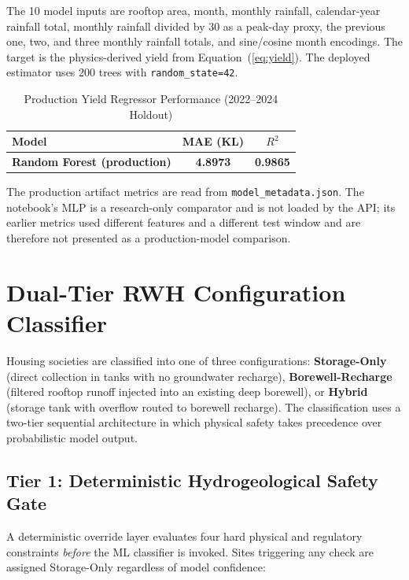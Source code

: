 ﻿\documentclass[conference]{IEEEtran}
\begin{document}
The 10 model inputs are rooftop area, month, monthly rainfall, calendar-year rainfall total, monthly rainfall divided by 30 as a peak-day proxy, the previous one, two, and three monthly rainfall totals, and sine/cosine month encodings. The target is the physics-derived yield from Equation~(\ref{eq:yield}). The deployed estimator uses 200 trees with \texttt{random\_state=42}.

\begin{table}[htbp]
\caption{Production Yield Regressor Performance (2022--2024 Holdout)}
\begin{center}
\begin{tabular}{lcc}
\toprule
\textbf{Model} & \textbf{MAE (KL)} & \textbf{$R^2$} \\
\midrule
\textbf{Random Forest (production)} & \textbf{4.8973} & \textbf{0.9865} \\
\bottomrule
\end{tabular}
\label{tab:yield-model}
\end{center}
\end{table}

The production artifact metrics are read from \texttt{model\_metadata.json}. The notebook's MLP is a research-only comparator and is not loaded by the API; its earlier metrics used different features and a different test window and are therefore not presented as a production-model comparison.

\section{Dual-Tier RWH Configuration Classifier}
\label{sec:classifier}

Housing societies are classified into one of three configurations: \textbf{Storage-Only} (direct collection in tanks with no groundwater recharge), \textbf{Borewell-Recharge} (filtered rooftop runoff injected into an existing deep borewell), or \textbf{Hybrid} (storage tank with overflow routed to borewell recharge). The classification uses a two-tier sequential architecture in which physical safety takes precedence over probabilistic model output.

\subsection{Tier 1: Deterministic Hydrogeological Safety Gate}

A deterministic override layer evaluates four hard physical and regulatory constraints \textit{before} the ML classifier is invoked. Sites triggering any check are assigned Storage-Only regardless of model confidence:
\end{document}
